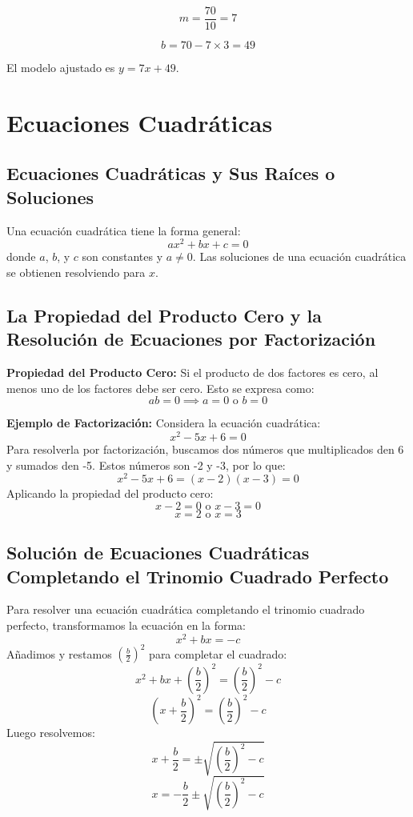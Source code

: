     \[
    m = \frac{70}{10} = 7
    \]
    
    \[
    b = 70 - 7 \times 3 = 49
    \]
    
    El modelo ajustado es \( y = 7x + 49 \).





    \section{Ecuaciones Cuadráticas} %

    \subsection{Ecuaciones Cuadráticas y Sus Raíces o Soluciones}
    
    Una ecuación cuadrática tiene la forma general:
    \begin{equation}
        ax^2 + bx + c = 0
    \end{equation}
    donde \(a\), \(b\), y \(c\) son constantes y \(a \neq 0\). Las soluciones de una ecuación cuadrática se obtienen resolviendo para \(x\).
    
    \subsection{La Propiedad del Producto Cero y la Resolución de Ecuaciones por Factorización}
    
    \textbf{Propiedad del Producto Cero:} Si el producto de dos factores es cero, al menos uno de los factores debe ser cero. Esto se expresa como:
    \[
    ab = 0 \implies a = 0 \text{ o } b = 0
    \]
    
    \textbf{Ejemplo de Factorización:} Considera la ecuación cuadrática:
    \[
    x^2 - 5x + 6 = 0
    \]
    Para resolverla por factorización, buscamos dos números que multiplicados den 6 y sumados den -5. Estos números son -2 y -3, por lo que:
    \[
    x^2 - 5x + 6 = (x - 2)(x - 3) = 0
    \]
    Aplicando la propiedad del producto cero:
    \[
    x - 2 = 0 \text{ o } x - 3 = 0
    \]
    \[
    x = 2 \text{ o } x = 3
    \]
    
    \subsection{Solución de Ecuaciones Cuadráticas Completando el Trinomio Cuadrado Perfecto}
    
    Para resolver una ecuación cuadrática completando el trinomio cuadrado perfecto, transformamos la ecuación en la forma:
    \[
    x^2 + bx = -c
    \]
    Añadimos y restamos \(\left(\frac{b}{2}\right)^2\) para completar el cuadrado:
    \[
    x^2 + bx + \left(\frac{b}{2}\right)^2 = \left(\frac{b}{2}\right)^2 - c
    \]
    \[
    \left(x + \frac{b}{2}\right)^2 = \left(\frac{b}{2}\right)^2 - c
    \]
    Luego resolvemos:
    \[
    x + \frac{b}{2} = \pm \sqrt{\left(\frac{b}{2}\right)^2 - c}
    \]
    \[
    x = -\frac{b}{2} \pm \sqrt{\left(\frac{b}{2}\right)^2 - c}
    \]
    
